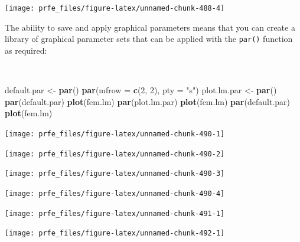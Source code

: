 \documentclass[12pt,a4paper]{book}
\newenvironment{Shaded}{\begin{snugshade}}{\end{snugshade}}
\newcommand{\KeywordTok}[1]{\textcolor[rgb]{0.13,0.29,0.53}{\textbf{#1}}}
\newcommand{\DataTypeTok}[1]{\textcolor[rgb]{0.13,0.29,0.53}{#1}}
\newcommand{\DecValTok}[1]{\textcolor[rgb]{0.00,0.00,0.81}{#1}}
\newcommand{\StringTok}[1]{\textcolor[rgb]{0.31,0.60,0.02}{#1}}
\newcommand{\NormalTok}[1]{#1}
\theoremstyle{definition}
\theoremstyle{definition}
\theoremstyle{definition}
\theoremstyle{remark}
\begin{document}
\begin{center}\texttt{[image: prfe\_files/figure-latex/unnamed-chunk-488-4]} \end{center}

\newpage

The ability to save and apply graphical parameters means that you can
create a library of graphical parameter sets that can be applied with
the \texttt{par()} function as required:

~

\begin{Shaded}
\begin{Highlighting}[]
\NormalTok{default.par <-}\StringTok{ }\KeywordTok{par}\NormalTok{()}
\KeywordTok{par}\NormalTok{(}\DataTypeTok{mfrow =} \KeywordTok{c}\NormalTok{(}\DecValTok{2}\NormalTok{, }\DecValTok{2}\NormalTok{), }\DataTypeTok{pty =} \StringTok{"s"}\NormalTok{)}
\NormalTok{plot.lm.par <-}\StringTok{ }\KeywordTok{par}\NormalTok{()}
\KeywordTok{par}\NormalTok{(default.par)}
\KeywordTok{plot}\NormalTok{(fem.lm)}
\KeywordTok{par}\NormalTok{(plot.lm.par)}
\KeywordTok{plot}\NormalTok{(fem.lm)}
\KeywordTok{par}\NormalTok{(default.par)}
\KeywordTok{plot}\NormalTok{(fem.lm)}
\end{Highlighting}
\end{Shaded}

\newpage

\begin{center}\texttt{[image: prfe\_files/figure-latex/unnamed-chunk-490-1]} \end{center}

\begin{center}\texttt{[image: prfe\_files/figure-latex/unnamed-chunk-490-2]} \end{center}

\begin{center}\texttt{[image: prfe\_files/figure-latex/unnamed-chunk-490-3]} \end{center}

\begin{center}\texttt{[image: prfe\_files/figure-latex/unnamed-chunk-490-4]} \end{center}

\newpage

\begin{center}\texttt{[image: prfe\_files/figure-latex/unnamed-chunk-491-1]} \end{center}

\newpage

\begin{center}\texttt{[image: prfe\_files/figure-latex/unnamed-chunk-492-1]} \end{center}
\end{document}
